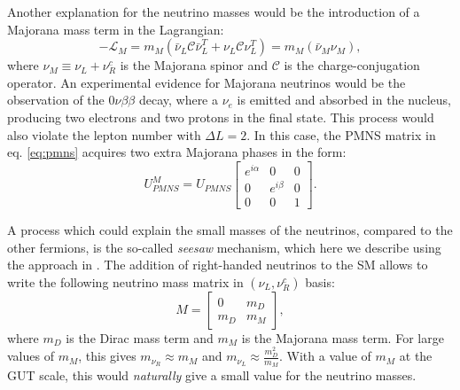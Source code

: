 Another explanation for the neutrino masses would be the introduction of a Majorana mass term in the Lagrangian:
\begin{equation}
    -\mathcal{L}_M = m_M(\bar{\nu}_L\mathcal{C}\bar{\nu}^{T}_L+\nu_{L}\mathcal{C}\nu^T_L) = m_M(\bar{\nu}_M\nu_M),
\end{equation}
where $\nu_{M} \equiv \nu_L + \nu^c_R$ is the Majorana spinor and $\mathcal{C}$ is the charge-conjugation operator. An experimental evidence for Majorana neutrinos would be the observation of the $0\nu\beta\beta$ decay, where a $\nu_{e}$ is emitted and absorbed in the nucleus, producing two electrons and two protons in the final state. This process would also violate the lepton number with $\Delta L = 2$. In this case, the PMNS matrix in eq. \eqref{eq:pmns} acquires two extra Majorana phases in the form:
\begin{equation}
    U_{PMNS}^M = U_{PMNS} \begin{bmatrix}
    e^{i\alpha} & 0 & 0 \\
    0 & e^{i\beta} & 0 \\
    0 & 0 & 1
    \end{bmatrix}.
\end{equation}

A process which could explain the small masses of the neutrinos, compared to the other fermions, is the so-called \emph{seesaw} mechanism, which here we describe using the approach in \cite{Grossman:2003eb}. The addition of right-handed neutrinos to the SM allows to write the following neutrino mass matrix in $(\nu_L, \nu_R^c)$ basis:
\begin{equation}
    M = \begin{bmatrix}
    0 & m_D \\
    m_D & m_M
    \end{bmatrix},
\end{equation}
where $m_D$ is the Dirac mass term and $m_M$ is the Majorana mass term. For large values of $m_M$, this gives $m_{\nu_R}\approx m_M$ and $m_{\nu_L}\approx\frac{m_D^2}{m_M}$. With a value of $m_M$ at the GUT scale, this would \emph{naturally} give a small value for the neutrino masses.